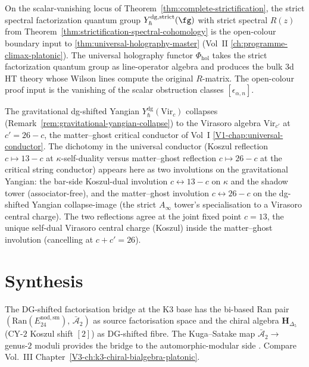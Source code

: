 \begin{remark}
\label{rem:dg-shifted-bridge-uhm-bridge}
On the scalar-vanishing locus of
Theorem~\ref{thm:complete-strictification}, the strict spectral
factorization quantum group $Y^{\mathrm{dg,strict}}_\hbar(\fg)$ with
strict spectral $R(z)$ from
Theorem~\ref{thm:strictification-spectral-cohomology} is the
open-colour boundary input to \cref{thm:universal-holography-master}
(Vol~II \cref{ch:programme-climax-platonic}). The universal holography
functor $\Phi_{\mathrm{hol}}$ takes the strict factorization quantum
group as line-operator algebra and produces the bulk $3$d HT theory
whose Wilson lines compute the original $R$-matrix. The open-colour
proof input is the vanishing of the scalar obstruction classes
$[\epsilon_{\alpha,n}]$.
\end{remark}

\begin{remark}
\label{rem:dg-shifted-bridge-conductor-bridge}
The gravitational dg-shifted Yangian
$Y^{\mathrm{dg}}_\hbar(\mathrm{Vir}_c)$ collapses
(Remark~\ref{rem:gravitational-yangian-collapse}) to the Virasoro
algebra $\mathrm{Vir}_{c'}$ at $c' = 26 - c$, the matter--ghost
critical conductor of Vol~I \cref{V1-chap:universal-conductor}. The
dichotomy in the universal conductor (Koszul reflection
$c \mapsto 13 - c$ at $\kappa$-self-duality versus matter--ghost
reflection $c\mapsto 26-c$ at the critical string conductor) appears
here as two involutions on the gravitational Yangian: the bar-side
Koszul-dual involution $c\leftrightarrow 13-c$ on $\kappa$ and the
shadow tower (associator-free), and the matter--ghost involution
$c\leftrightarrow 26-c$ on the dg-shifted Yangian collapse-image (the
strict $A_\infty$ tower's specialisation to a Virasoro central
charge). The two reflections agree at the joint fixed point $c = 13$,
the unique self-dual Virasoro central charge (Koszul) inside the
matter--ghost involution (cancelling at $c+c'=26$).
\end{remark}

\section{Synthesis}
\label{sec:dgsfb-supplement}

\begin{remark}
\label{rem:dgsfb-1}
The DG-shifted factorisation bridge at the K3 base has
the bi-based Ran pair $(\mathrm{Ran}(E^{\mathrm{nod,sm}}_{24}),\,\bar{\mathcal A}_2)$
as source factorisation space and the chiral algebra $\mathbf H_{\Delta_5}$
(CY-$2$ Koszul shift $[2]$) as DG-shifted fibre. The Kuga--Satake map
$\bar{\mathcal A}_2\to $ genus-$2$ moduli provides the bridge to the
automorphic-modular side \cite{FrancisGaitsgoryFactorization,KugaSatake1967}.
Compare Vol.~III Chapter~\ref{V3-ch:k3-chiral-bialgebra-platonic}.
\end{remark}

